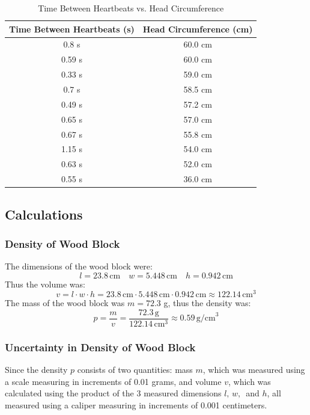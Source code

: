\documentclass{article}
\begin{document}
\begin{table}[H]
\centering
\begin{tabular}{|c|c|}
    \hline
    \rowcolor{black}
    \color{white} Time Between Heartbeats (s) & \color{white} Head Circumference (cm) \\
    \hline
    0.8 s  & 60.0 cm \\
    \hline
    0.59 s & 60.0 cm \\
    \hline
    0.33 s & 59.0 cm \\
    \hline
    0.7 s  & 58.5 cm \\
    \hline
    0.49 s & 57.2 cm \\
    \hline
    0.65 s & 57.0 cm \\
    \hline
    0.67 s & 55.8 cm \\
    \hline
    1.15 s & 54.0 cm \\
    \hline
    0.63 s & 52.0 cm \\
    \hline
    0.55 s & 36.0 cm \\

    \hline
\end{tabular} 
\caption{Time Between Heartbeats vs. Head Circumference}
\end{table}

\subsection{Calculations}
\subsubsection{Density of Wood Block}
The dimensions of the wood block were:
\[ l = 23.8\,\mathrm{cm} \quad w = 5.448\,\mathrm{cm} \quad  h = 0.942\,\mathrm{cm}\]
Thus the volume was:
\[ 
    v = 
    l\cdot w \cdot h = 
    23.8\,\mathrm{cm} \cdot 5.448\,\mathrm{cm} \cdot 0.942\,\mathrm{cm} 
    \approx122.14\,\mathrm{cm}^3
\]
The mass of the wood block was $m=72.3$ g, thus the density was:
\[
    p = \frac{m}{v} = \frac{72.3\,\mathrm{g}}{122.14\,\mathrm{cm}^3} \approx 0.59 \,\mathrm{g/cm}^3    
\]
\subsubsection{Uncertainty in Density of Wood Block}
Since the density $p$ consists of two quantities: mass $m$, which was measured using a scale 
measuring in increments of 0.01 grams, and volume $v$, which was calculated using the product of 
the 3 measured dimensions $l,\,w,\,$ and $h$, all measured using a caliper measuring in increments 
of 0.001 centimeters. 
\end{document}
